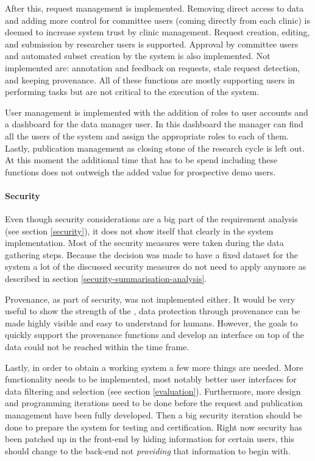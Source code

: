 After this, request management is implemented.
Removing direct access to data and adding more control for committee users (coming directly from each clinic) is deemed to increase system trust by clinic management.
Request creation, editing, and submission by researcher users is supported.
Approval by committee users and automated subset creation by the system is also implemented.
Not implemented are: annotation and feedback on requests, stale request detection, and keeping provenance.
All of these functions are mostly supporting users in performing tasks but are not critical to the execution of the system.

User management is implemented with the addition of roles to user accounts and a dashboard for the data manager user.
In this dashboard the manager can find all the users of the system and assign the appropriate roles to each of them.
Lastly, publication management as closing stone of the research cycle is left out.
At this moment the additional time that has to be spend including these functions does not outweigh the added value for prospective demo users.

\paragraph{Security}
Even though security considerations are a big part of the requirement analysis (see section \ref{security}), it does not show itself that clearly in the system implementation.
Most of the security measures were taken during the data gathering steps.
Because the decision was made to have a fixed dataset for the system a lot of the discussed security measures do not need to apply anymore as described in section \ref{security-summarisation-analysis}.

Provenance, as part of security, was not implemented either.
It would be very useful to show the strength of the \ivfsystem{}, data protection through provenance can be made highly visible and easy to understand for humans.
However, the goals to quickly support the provenance functions and develop an interface on top of the data could not be reached within the time frame.

Lastly, in order to obtain a working system a few more things are needed.
More functionality needs to be implemented, most notably better user interfaces for data filtering and selection (see section \ref{evaluation}).
Furthermore, more design and programming iterations need to be done before the request and publication management have been fully developed.
Then a big security iteration should be done to prepare the system for testing and certification.
Right now security has been patched up in the front-end by hiding information for certain users, this should change to the back-end not \emph{providing} that information to begin with.
